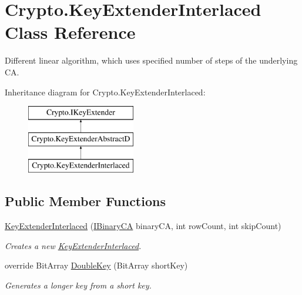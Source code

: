 \hypertarget{class_crypto_1_1_key_extender_interlaced}{}\section{Crypto.\+Key\+Extender\+Interlaced Class Reference}
\label{class_crypto_1_1_key_extender_interlaced}


Different linear algorithm, which uses specified number of steps of the underlying C\+A.  


Inheritance diagram for Crypto.\+Key\+Extender\+Interlaced\+:\begin{figure}[H]
\begin{center}
\leavevmode
\includegraphics[height=3.000000cm]{class_crypto_1_1_key_extender_interlaced}
\end{center}
\end{figure}
\subsection*{Public Member Functions}
\begin{DoxyCompactItemize}
\item 
\hyperlink{class_crypto_1_1_key_extender_interlaced_a00ed5af7a686d03b60fa8c3607c27d6b}{Key\+Extender\+Interlaced} (\hyperlink{interface_cellular_1_1_i_binary_c_a}{I\+Binary\+C\+A} binary\+C\+A, int row\+Count, int skip\+Count)
\begin{DoxyCompactList}\small\item\em Creates a new \hyperlink{class_crypto_1_1_key_extender_interlaced}{Key\+Extender\+Interlaced}. \end{DoxyCompactList}\item 
override Bit\+Array \hyperlink{class_crypto_1_1_key_extender_interlaced_a1caf1b3ad04b24305f964ab44a399751}{Double\+Key} (Bit\+Array short\+Key)
\begin{DoxyCompactList}\small\item\em Generates a longer key from a short key. \end{DoxyCompactList}\end{DoxyCompactItemize}


